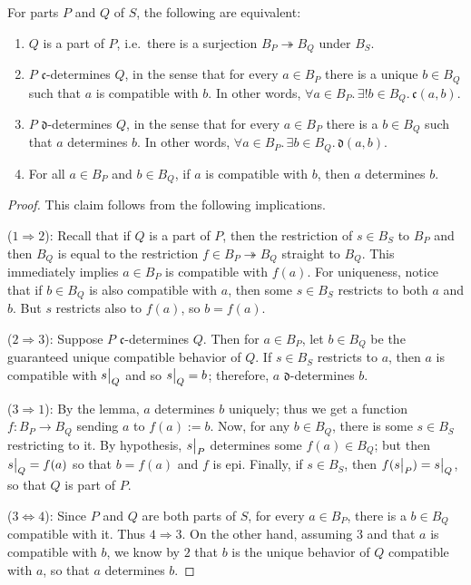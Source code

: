 \begin{prop}\label{Things:lem:Determines.Mereology}
For parts $P$ and $Q$ of $S$, the following are equivalent:
\begin{enumerate}
    \item $Q$ is a part of $P$, i.e.\ there is a surjection $B_P\twoheadrightarrow
      B_Q$ under $B_S$.
    \item $P$ $\mathfrak{c}$-determines $Q$, in the sense that for every $a \in B_P$ there is a unique $b \in B_Q$ such that $a$ is compatible with $b$.  In other words, $\forall a \in B_P.\, \exists! b \in B_Q.\, \mathfrak{c}(a, b)$.
    \item $P$ $\mathfrak{d}$-determines $Q$, in the sense that for every $a \in B_P$ there is a $b \in B_Q$ such that $a$ determines $b$. In other words, $\forall a \in B_P.\, \exists b \in B_Q.\, \mathfrak{d}(a, b)$.
    \item For all $a \in B_P$ and $b \in B_Q$, if $a$ is compatible with $b$, then $a$ determines $b$.
\end{enumerate}
\end{prop}
\begin{proof}
This claim follows from the following implications.

($1 \Rightarrow 2$): Recall that if $Q$ is a part of $P$, then the restriction of $s \in B_S$ to $B_P$ and then $B_Q$ is equal to the restriction $f \in B_P \twoheadrightarrow B_Q$ straight to $B_Q$. This immediately implies $a \in B_P$ is compatible with $f(a)$. For uniqueness, notice that if $b \in B_Q$ is also compatible with $a$, then some $s \in B_S$ restricts to both $a$ and $b$. But $s$ restricts also to $f(a)$, so $b = f(a)$.
    
($2 \Rightarrow 3$): Suppose $P$ $\mathfrak{c}$-determines $Q$. Then for $a \in B_P$, let $b \in B_Q$ be the guaranteed unique compatible behavior of $Q$. If $s \in B_S$ restricts to $a$, then $a$ is compatible with $s\big|_{Q}$ and so $s\big|_{Q} = b$; therefore, $a$ $\mathfrak{d}$-determines $b$.
    
($3 \Rightarrow 1$): By the lemma, $a$ determines $b$ uniquely; thus we get a function $f : B_P \to B_Q$ sending $a$ to $f(a) := b$. Now, for any $b \in B_Q$, there is some $s \in B_S$ restricting to it. By hypothesis, $s\big|_{P}$ determines some $f(a) \in B_Q$; but then $s\big|_{Q} = f(a)$ so that $b = f(a)$ and $f$ is epi. Finally, if $s \in B_S$, then $f(s\big|_{P}) = s\big|_{Q}$, so that $Q$ is part of $P$.
    
($3 \Leftrightarrow 4$): Since $P$ and $Q$ are both parts of $S$, for every $a
\in B_P$, there is a $b \in B_Q$ compatible with it. Thus $4 \Rightarrow 3$. On the other hand, assuming $3$ and that $a$ is compatible with $b$, we know by $2$ that $b$ is the unique behavior of $Q$ compatible with $a$, so that $a$ determines $b$. \qedhere
\end{proof}

